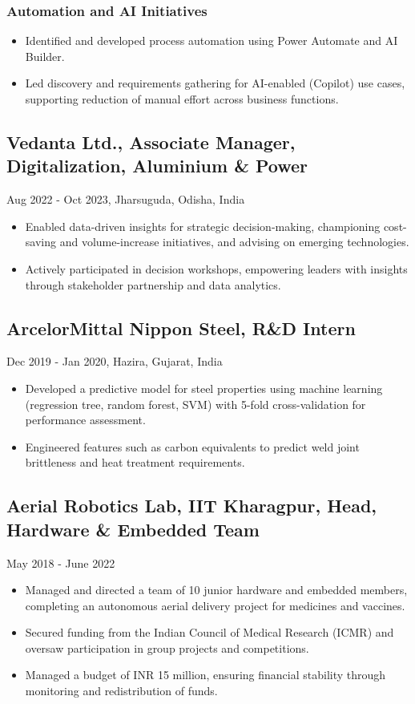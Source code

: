 \documentclass[11pt,a4paper]{article}
\begin{document}
\subsubsection*{Automation and AI Initiatives}
\begin{itemize}
    \item Identified and developed process automation using Power Automate and
          AI Builder.
    \item Led discovery and requirements gathering for AI-enabled (Copilot)
          use cases, supporting reduction of manual effort across business
          functions.
\end{itemize}

\subsection*{Vedanta Ltd., Associate Manager, Digitalization, Aluminium \& Power}
Aug 2022 - Oct 2023, Jharsuguda, Odisha, India
\begin{itemize}
    \item Enabled data-driven insights for strategic decision-making, championing
          cost-saving and volume-increase initiatives, and advising on emerging
          technologies.
    \item Actively participated in decision workshops, empowering leaders with
          insights through stakeholder partnership and data analytics.
\end{itemize}

\subsection*{ArcelorMittal Nippon Steel, R\&D Intern}
Dec 2019 - Jan 2020, Hazira, Gujarat, India
\begin{itemize}
    \item Developed a predictive model for steel properties using machine
          learning (regression tree, random forest, SVM) with 5-fold
          cross-validation for performance assessment.
    \item Engineered features such as carbon equivalents to predict weld joint
          brittleness and heat treatment requirements.
\end{itemize}

\subsection*{Aerial Robotics Lab, IIT Kharagpur, Head, Hardware \& Embedded Team}
May 2018 - June 2022
\begin{itemize}
    \item Managed and directed a team of 10 junior hardware and embedded members,
          completing an autonomous aerial delivery project for medicines and
          vaccines.
    \item Secured funding from the Indian Council of Medical Research (ICMR) and
          oversaw participation in group projects and competitions.
    \item Managed a budget of INR 15 million, ensuring financial stability
          through monitoring and redistribution of funds.
\end{itemize}
\end{document}

